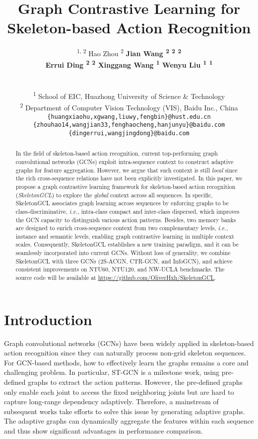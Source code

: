 \documentclass{article} \usepackage{iclr2023_conference,times}
\title{Graph Contrastive Learning for Skeleton-based Action Recognition}
\author{\quad\quad\quad{Xiaohu Huang} \textsuperscript{1, 2}\footnotemark[1] \quad
{Hao Zhou} \textsuperscript{2} \footnotemark[2] \quad \textbf{{Jian Wang} \textsuperscript{2} \quad {Haocheng Feng} \textsuperscript{2} \quad {Junyu Han} \textsuperscript{2}}\\ \quad\quad\quad
\textbf{{Errui Ding} \textsuperscript{2} \quad {Jingdong Wang} \textsuperscript{2} \quad
 {Xinggang Wang} \textsuperscript{1} \quad
{Wenyu Liu} \textsuperscript{1} \quad {Bin Feng} \textsuperscript{1}} \footnotemark[2] \\
\\
\\
\quad\quad\quad \textsuperscript{1} School of EIC, Huazhong University of Science \& Technology \\
\quad\quad\quad \textsuperscript{2} Department of Computer Vision Technology (VIS), Baidu Inc., China \\
\texttt{\quad\quad\quad \{huangxiaohu,xgwang,liuwy,fengbin\}@hust.edu.cn} \\
\texttt{\quad\quad\quad \{zhouhao14,wangjian33,fenghaocheng,hanjunyu\}@baidu.com} \\
\texttt{\quad\quad\quad \{dingerrui,wangjingdong\}@baidu.com}
}
\begin{document}
\maketitle

\begin{abstract}
In the field of skeleton-based action recognition, current top-performing graph convolutional networks (GCNs) exploit intra-sequence context to construct adaptive graphs for feature aggregation. However, we argue that such context is still \textit{local} since the rich cross-sequence relations have not been explicitly investigated. In this paper, we propose a graph contrastive learning framework for skeleton-based action recognition (\textit{SkeletonGCL}) to explore the \textit{global} context across all sequences. In specific, SkeletonGCL associates graph learning across sequences by enforcing graphs to be class-discriminative, \emph{i.e.,} intra-class compact and inter-class dispersed, which improves the GCN capacity to distinguish various action patterns. Besides, two memory banks are designed to enrich cross-sequence context from two complementary levels, \emph{i.e.,} instance and semantic levels, enabling graph contrastive learning in multiple context scales. Consequently, SkeletonGCL establishes a new training paradigm, and it can be seamlessly incorporated into current GCNs. Without loss of generality, we combine SkeletonGCL with three GCNs (2S-ACGN, CTR-GCN, and InfoGCN), and achieve consistent improvements on NTU60, NTU120, and NW-UCLA benchmarks. The source code will be available at \url{https://github.com/OliverHxh/SkeletonGCL}.
\end{abstract}

\renewcommand{\thefootnote}{\fnsymbol{footnote}}

\section{Introduction}
\label{sec:intro}
Graph convolutional networks (GCNs) have been widely applied in skeleton-based action recognition since they can naturally process non-grid skeleton sequences. For GCN-based methods, how to effectively learn the graphs remains a core and challenging problem. In particular, ST-GCN \citep{stgcn} is a milestone work, using pre-defined graphs to extract the action patterns. However, the pre-defined graphs only enable each joint to access the fixed neighboring joints but are hard to capture long-range dependency adaptively. Therefore, a mainstream of subsequent works \citep{ASGCN, 2SAGCN, CAGCN, SGN, DynamicGCN, CTRGCN, INFOGCN} take efforts to solve this issue by generating adaptive graphs. The adaptive graphs can dynamically aggregate the features within each sequence and thus show significant advantages in performance comparison.
\end{document}
